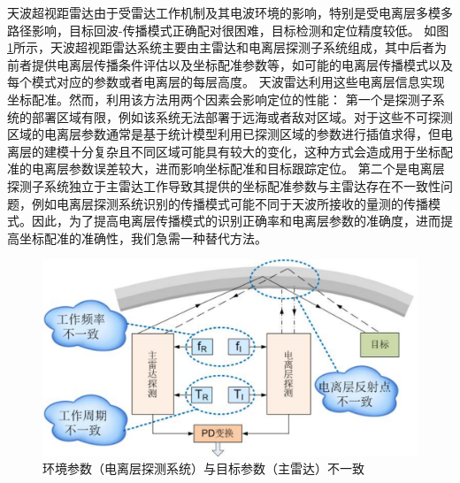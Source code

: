 天波超视距雷达由于受雷达工作机制及其电波环境的影响，特别是受电离层多模多路径影响，目标回波-传播模式正确配对很困难，目标检测和定位精度较低。
如图\ref{fig:pdproblem}所示，天波超视距雷达系统主要由主雷达和电离层探测子系统组成，其中后者为前者提供电离层传播条件评估以及坐标配准参数等，如可能的电离层传播模式以及每个模式对应的参数或者电离层的每层高度\cite{wheadon1994ionospheric}。
天波雷达利用这些电离层信息实现坐标配准。然而，利用该方法用两个因素会影响定位的性能：
第一个是探测子系统的部署区域有限，例如该系统无法部署于远海或者敌对区域。对于这些不可探测区域的电离层参数通常是基于统计模型利用已探测区域的参数进行插值求得，但电离层的建模十分复杂且不同区域可能具有较大的变化，这种方式会造成用于坐标配准的电离层参数误差较大，进而影响坐标配准和目标跟踪定位。
第二个是电离层探测子系统独立于主雷达工作导致其提供的坐标配准参数与主雷达存在不一致性问题，例如电离层探测系统识别的传播模式可能不同于天波所接收的量测的传播模式。因此，为了提高电离层传播模式的识别正确率和电离层参数的准确度，进而提高坐标配准的准确性，我们急需一种替代方法。
\begin{figure}[H]
	\centering
	\includegraphics[width=\textwidth]{figures/pdproblem}
	\caption{环境参数（电离层探测系统）与目标参数（主雷达）不一致}
	\label{fig:pdproblem}
\end{figure}


